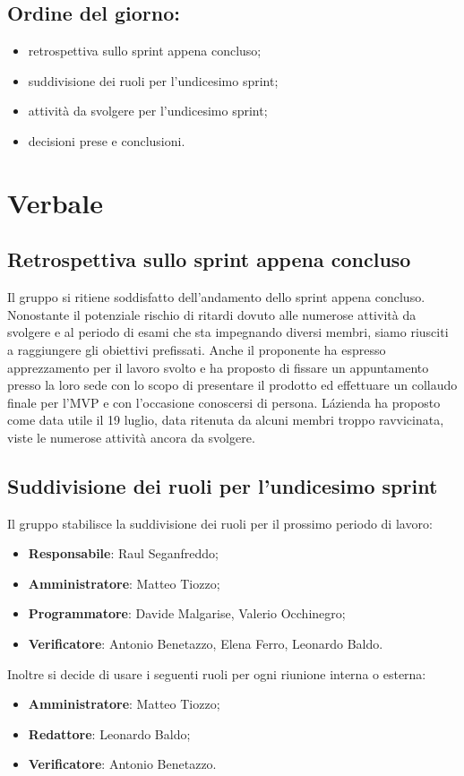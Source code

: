 \documentclass[italian,12pt]{article}
\begin{document}
\subsection*{Ordine del giorno:}
\begin{itemize}
	\item retrospettiva sullo sprint appena concluso;
	\item suddivisione dei ruoli per l'undicesimo sprint;
	\item attività da svolgere per l'undicesimo sprint;
	\item decisioni prese e conclusioni.
\end{itemize}


\newpage

\section{Verbale}

\subsection{Retrospettiva sullo sprint appena concluso}
Il gruppo si ritiene soddisfatto dell'andamento dello sprint appena concluso. Nonostante il potenziale rischio di ritardi dovuto alle numerose attività da svolgere e al periodo di esami che sta impegnando diversi membri, siamo riusciti a raggiungere gli obiettivi prefissati. Anche il proponente ha espresso apprezzamento per il lavoro svolto e ha proposto di fissare un appuntamento presso la loro sede con lo scopo di presentare il prodotto ed effettuare un collaudo finale per l'MVP e con l'occasione conoscersi di persona. Lázienda ha proposto come data utile il 19 luglio, data ritenuta da alcuni membri troppo ravvicinata, viste le numerose attività ancora da svolgere.

\subsection{Suddivisione dei ruoli per l'undicesimo sprint}
Il gruppo stabilisce la suddivisione dei ruoli per il prossimo periodo di lavoro:
\begin{itemize}
	\item \textbf{Responsabile}: Raul Seganfreddo;
	\item \textbf{Amministratore}: Matteo Tiozzo;
	\item \textbf{Programmatore}: Davide Malgarise, Valerio Occhinegro;
	\item \textbf{Verificatore}: Antonio Benetazzo, Elena Ferro, Leonardo Baldo.
\end{itemize}
\newblock
Inoltre si decide di usare i seguenti ruoli per ogni riunione interna o esterna:
\begin{itemize}
	\item \textbf{Amministratore}: Matteo Tiozzo;
	\item \textbf{Redattore}: Leonardo Baldo;
	\item \textbf{Verificatore}: Antonio Benetazzo.
\end{itemize}
\end{document}
